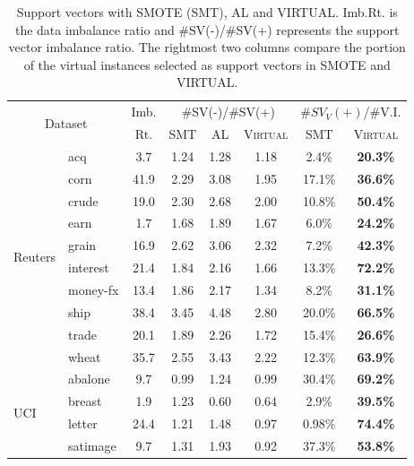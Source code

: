 \begin{table}[!t]
\centering \small
\caption{Support vectors with SMOTE (SMT), AL and VIRTUAL. Imb.Rt. is the data imbalance ratio and
\#SV(-)/\#SV(+) represents the support vector imbalance ratio. The rightmost two columns compare the portion of the virtual instances selected as support vectors in SMOTE and VIRTUAL.}
\small
\begin{tabular}{l@{\hspace{1mm}}|l@{\hspace{1mm}}|c@{\hspace{1mm}}|c@{\hspace{1mm}}|c@{\hspace{1mm}}|c@{\hspace{1mm}}|c@{\hspace{1mm}}|c}
\hline
\multicolumn{2}{c|}{\multirow{2}{1cm}{Dataset}}&Imb.&\multicolumn{3}{c|}{\#SV(-)/\#SV(+)}&\multicolumn{2}{c}{\#$SV_V(+)$/\#V.I.}\\\cline{4-8}
\multicolumn{2}{c|}{}&Rt.&SMT&AL&\textsc{Virtual}&SMT&\textsc{Virtual}\\
\hline\hline
\multirow{10}{2mm}{\begin{sideways}\parbox{13mm}{Reuters}\end{sideways}}
&acq&3.7&1.24&1.28&1.18&2.4\%&\textbf{20.3\%}\\
&corn&41.9&2.29&3.08&1.95&17.1\%&\textbf{36.6\%}\\
&crude&19.0&2.30&2.68&2.00&10.8\%&\textbf{50.4\%}\\
&earn&1.7&1.68&1.89&1.67&6.0\%&\textbf{24.2\%}\\
&grain&16.9&2.62&3.06&2.32&7.2\%&\textbf{42.3\%}\\
&interest&21.4&1.84&2.16&1.66&13.3\%&\textbf{72.2\%}\\
&money-fx&13.4&1.86&2.17&1.34&8.2\%&\textbf{31.1\%}\\
&ship&38.4&3.45&4.48&2.80&20.0\%&\textbf{66.5\%}\\
&trade&20.1&1.89&2.26&1.72&15.4\%&\textbf{26.6\%}\\
&wheat&35.7&2.55&3.43&2.22&12.3\%&\textbf{63.9\%}\\
\hline\hline
\multirow{4}{2mm}{\begin{sideways}\parbox{5mm}{UCI}\end{sideways}}
&abalone&9.7&0.99&1.24&0.99&30.4\%&\textbf{69.2\%}\\
&breast&1.9&1.23&0.60&0.64&2.9\%&\textbf{39.5\%}\\
&letter&24.4&1.21&1.48&0.97&0.98\%&\textbf{74.4\%}\\
&satimage&9.7&1.31&1.93&0.92&37.3\%&\textbf{53.8\%}\\
\hline
\end{tabular}
\label{tbl:res_svs}
\end{table}

